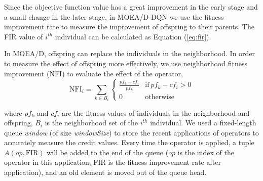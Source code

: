 \documentclass[journal]{IEEEtran}
\newcommand{\TODO}[1]{\textcolor[rgb]{1.00,0.40,0.22}{#1}}
\begin{document}
Since the objective function value has a great improvement in the early stage and a small change in the later stage, in MOEA/D-DQN we use the fitness improvement rate to measure the improvement of offspring to their parents.
The FIR value of $i^{th}$ individual can be calculated as Equation (\ref{eq:fir}).


In MOEA/D, offspring can replace the individuals in the neighborhood. In order to measure the effect of offspring more effectively, we use neighborhood fitness improvement (NFI) to evaluate the effect of the operator,
\begin{equation}
  \text{NFI}_{i}= \sum_{k \in B_i}
  \left\{
  \begin{array}{ll}
    \frac{pf_{k}-cf_{i}}{pf_{k}} & \text{if}\ pf_{k}-cf_{i}>0 \\

    0                            & \text{otherwise}
  \end{array}
  \right.
  \label{eq:nfi}
\end{equation}

where $pf_{k}$ and $cf_{i}$ are the fitness values of individuals in the neighborhood and offspring, $B_i$ is the neighborhood set of the $i^{th}$ individual.
% 
We used a fixed-length queue \textit{window} (of size \textit{windowSize}) to store the recent applications of operators to accurately measure the credit values.
Every time the operator is applied, a tuple $A (op, \text{FIR})$ will be added to the end of the queue ($op$ is the index of the operator in this application, FIR is the fitness improvement rate after application), and an old element is moved out of the queue head.
\end{document}
